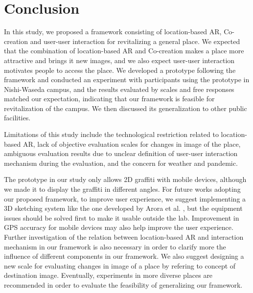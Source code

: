 \chapter{Conclusion}\label{ch:7}

In this study, we proposed a framework consisting of location-based AR, Co-creation and user-user interaction for revitalizing a general place.
We expected that the combination of location-based AR and Co-creation makes a place more attractive and brings it new images, and we also expect user-user interaction motivates people to access the place.
We developed a prototype following the framework and conducted an experiment with participants using the prototype in Nishi-Waseda campus, and the results evaluated by scales and free responses matched our expectation,
indicating that our framework is feasible for revitalization of the campus.
We then discussed its generalization to other public facilities.

Limitations of this study include the technological restriction related to location-based AR, lack of objective evaluation scales for changes in image of the place,
ambiguous evaluation results due to unclear definition of user-user interaction mechanism during the evaluation, and the concern for weather and pandemic.

The prototype in our study only allows 2D graffiti with mobile devices, although we made it to display the graffiti in different angles.
For future works adopting our proposed framework, to improve user experience, we suggest implementing a 3D sketching system like the one developed by Arora et al. \cite{arora_habib_kazi_grossman_fitzmaurice_singh_2018}, but the equipment issues should be solved first to make it usable outside the lab.
Improvement in GPS accuracy for mobile devices may also help improve the user experience.
Further investigation of the relation between location-based AR and interaction mechanism in our framework is also necessary in order to clarify more the influence of different components in our framework.
We also suggest designing a new scale for evaluating changes in image of a place by refering to concept of destination image.
Eventually, experiments in more diverse places are recommended in order to evaluate the feasibility of generalizing our framework.